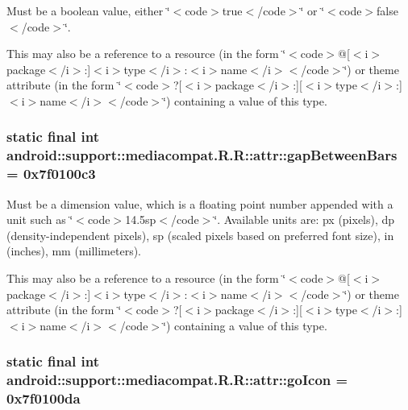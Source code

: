 Must be a boolean value, either \char`\"{}$<$code$>$true$<$/code$>$\char`\"{} or \char`\"{}$<$code$>$false$<$/code$>$\char`\"{}. 

This may also be a reference to a resource (in the form \char`\"{}$<$code$>$@\mbox{[}$<$i$>$package$<$/i$>$:\mbox{]}$<$i$>$type$<$/i$>$:$<$i$>$name$<$/i$>$$<$/code$>$\char`\"{}) or theme attribute (in the form \char`\"{}$<$code$>$?\mbox{[}$<$i$>$package$<$/i$>$:\mbox{]}\mbox{[}$<$i$>$type$<$/i$>$:\mbox{]}$<$i$>$name$<$/i$>$$<$/code$>$\char`\"{}) containing a value of this type. \hypertarget{classandroid_1_1support_1_1mediacompat_1_1_r_1_1attr_4ad76826cb35a8728a15d5521121268c}{
\subsubsection[{gapBetweenBars}]{\setlength{\rightskip}{0pt plus 5cm}static final int android::support::mediacompat.R.R::attr::gapBetweenBars = 0x7f0100c3}}
\label{classandroid_1_1support_1_1mediacompat_1_1_r_1_1attr_4ad76826cb35a8728a15d5521121268c}


Must be a dimension value, which is a floating point number appended with a unit such as \char`\"{}$<$code$>$14.5sp$<$/code$>$\char`\"{}. Available units are: px (pixels), dp (density-independent pixels), sp (scaled pixels based on preferred font size), in (inches), mm (millimeters). 

This may also be a reference to a resource (in the form \char`\"{}$<$code$>$@\mbox{[}$<$i$>$package$<$/i$>$:\mbox{]}$<$i$>$type$<$/i$>$:$<$i$>$name$<$/i$>$$<$/code$>$\char`\"{}) or theme attribute (in the form \char`\"{}$<$code$>$?\mbox{[}$<$i$>$package$<$/i$>$:\mbox{]}\mbox{[}$<$i$>$type$<$/i$>$:\mbox{]}$<$i$>$name$<$/i$>$$<$/code$>$\char`\"{}) containing a value of this type. \hypertarget{classandroid_1_1support_1_1mediacompat_1_1_r_1_1attr_407fd7c20340fa4e78a3b9f39242477a}{
\subsubsection[{goIcon}]{\setlength{\rightskip}{0pt plus 5cm}static final int android::support::mediacompat.R.R::attr::goIcon = 0x7f0100da}}
\label{classandroid_1_1support_1_1mediacompat_1_1_r_1_1attr_407fd7c20340fa4e78a3b9f39242477a}


